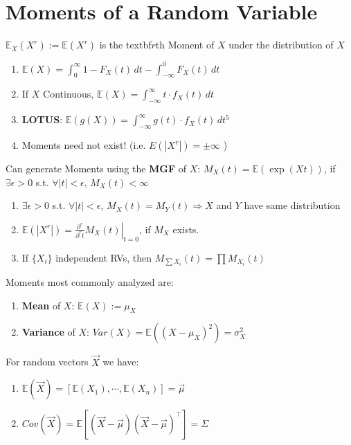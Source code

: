 \documentclass[a4paper,portrait,columns=2, hidelinks]{cheatsheet}
\begin{document}
\section{Moments of a Random Variable}
\(\mathbb{E}_X(X^r) := \mathbb{E}(X^r)\) is the textbf{\(r\)th Moment} of \(X\) under the distribution of \(X\)
\begin{enumerate}
	\item \(\mathbb{E}(X) = \int_0^\infty 1 - F_X(t)\,dt - \int_{-\infty}^0 F_X(t)\,dt\)
	\item If \(X\) Continuous, \(\mathbb{E}(X) = \int_{-\infty}^{\infty} t \cdot f_X(t)\,dt\)
	\item \textbf{LOTUS}: \(\mathbb{E}(g(X)) = \int_{-\infty}^{\infty} g(t) \cdot f_X(t)\,dt\)\hyperref[sec:ft5]{$^5$}
	\item Moments need not exist! (i.e. \(E(|X^r|)=\pm\infty\) )
\end{enumerate}
Can generate Moments using the \textbf{MGF} of \(X\): \( M_X(t) = \mathbb{E} \left(\exp(Xt) \right) \), if \( \exists \epsilon >0 \) s.t. \( \forall |t| < \epsilon\),  \(M_X(t) < \infty \)
\begin{enumerate}
	\item \( \exists \epsilon >0 \) s.t. \( \forall |t| < \epsilon\),  \(M_X(t) = M_Y(t) \Rightarrow X\) and \(Y\) have same distribution
	\item \(\mathbb{E}(|X^r|) = \left.\frac{\partial^r}{\partial^r t}M_X(t)\right\rvert_{t=0}\), if \(M_X\) exists.
	\item If \(\{ X_i\}\) independent RVs, then \( M_{\sum X_i} (t) = \prod M_{X_i}(t)\)
\end{enumerate}

Moments most commonly analyzed are:
\begin{enumerate}
	\item \textbf{Mean} of \(X\): \(\mathbb{E}(X):=\mu_X\)
	\item \textbf{Variance} of \(X\): \(Var(X)=\mathbb{E}((X-\mu_{X})^2)=\sigma^2_{X}\)
\end{enumerate}

For random vectors \(\vec{X}\) we have:
\begin{enumerate}
	\item \(\mathbb{E}(\vec{X}) = [\mathbb{E}(X_1), \cdots, \mathbb{E}(X_n)]=\vec{\mu}\)
	\item \(Cov(\vec{X})= \mathbb{E}[(\vec{X}-\vec{\mu})(\vec{X}-\vec{\mu})^\intercal] = \Sigma\)
\end{enumerate}
\end{document}
